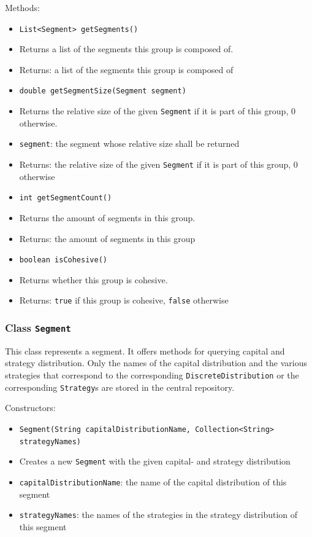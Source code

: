 \documentclass[parskip=full,11pt]{scrartcl}
\begin{document}
Methods:
\begin{itemize}\itemsep -10pt
\item \texttt{List<Segment> getSegments()}
\item[] Returns a list of the segments this group is composed of.
\item[] Returns: a list of the segments this group is composed of

\item \texttt{double getSegmentSize(Segment segment)}
\item[] Returns the relative size of the given \texttt{Segment} if it is part of this group, \(0\) otherwise.
\item[] \texttt{segment}: the segment whose relative size shall be returned
\item[] Returns: the relative size of the given \texttt{Segment} if it is part of this group, \(0\) otherwise

\item \texttt{int getSegmentCount()}
\item[] Returns the amount of segments in this group.
\item[] Returns: the amount of segments in this group

\item \texttt{boolean isCohesive()}
\item[] Returns whether this group is cohesive.
\item[] Returns: \texttt{true} if this group is cohesive, \texttt{false} otherwise
\end{itemize}

\subsubsection{Class \texttt{Segment}}

This class represents a segment. It offers methods for querying capital and strategy distribution. Only the names of the capital distribution and the various strategies that correspond to the corresponding \texttt{DiscreteDistribution} or the corresponding \texttt{Strategy}s are stored in the central repository.

Constructors:
\begin{itemize}\itemsep -10pt
\item \texttt{Segment(String capitalDistributionName, Collection<String> strategyNames)}
\item[] Creates a new \texttt{Segment} with the given capital- and strategy distribution
\item[] \texttt{capitalDistributionName}: the name of the capital distribution of this segment
\item[] \texttt{strategyNames}: the names of the strategies in the strategy distribution of this segment
\end{itemize}
\end{document}
